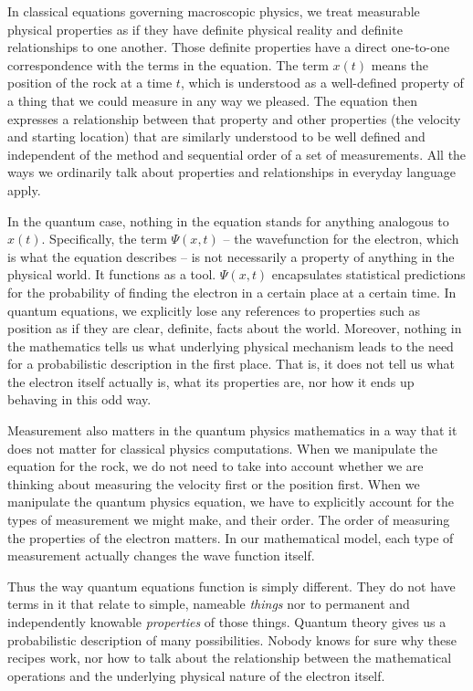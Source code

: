 \documentclass[12pt,onecolumn,preprintnumbers,amsmath,amssymbn,reprint,nofootinbib,superscriptaddress]{revtex4}    %
\begin{document}
In classical equations governing macroscopic physics, we treat measurable physical properties as if they have definite physical reality and definite relationships to one another.  Those definite properties have a direct one-to-one correspondence with the terms in the equation.  The term $x(t)$ means the position of the rock at a time $t$, which is understood as a well-defined property of a thing that we could measure in any way we pleased.  The equation then expresses a relationship between that property and other properties (the velocity and starting location) that are similarly understood to be well defined and independent of the method and sequential order of a set of measurements.   All the ways we ordinarily talk about properties and relationships in everyday language apply.  

In the quantum case, nothing in the equation stands for anything analogous to $x(t)$.  Specifically, the term $\Psi(x,t)$  -- the wavefunction for the electron, which is what the equation describes -- is not necessarily a property of anything in the physical world.  It functions as a tool.  $\Psi(x,t)$ encapsulates statistical predictions for the probability of finding the electron in a certain place at a certain time.  In quantum equations, we explicitly lose any references to properties such as position as if they are clear, definite, facts about the world. Moreover, nothing in the mathematics tells us what underlying physical mechanism leads to the need for a probabilistic description in the first place.  That is, it does not tell us what the electron itself actually is, what its properties are, nor how it ends up behaving in this odd way.

Measurement also matters in the quantum physics mathematics in a way that it does not matter for classical physics computations.  When we manipulate the equation for the rock, we do not need to take into account whether we are thinking about measuring the velocity first or the position first.  When we manipulate the quantum physics equation, we have to explicitly account for the types of measurement we might make, and their order. The order of measuring the properties of the electron matters.  In our mathematical model, each type of measurement actually changes the wave function itself.  

Thus the way quantum equations function is simply different.  They do not have terms in it that relate to simple, nameable {\em things} nor to permanent and independently knowable {\em properties} of those things.  Quantum theory gives us a probabilistic description of many possibilities.  Nobody knows for sure why these recipes work, nor how to talk about the relationship between the mathematical operations and the underlying physical nature of the electron itself.  
\end{document}
